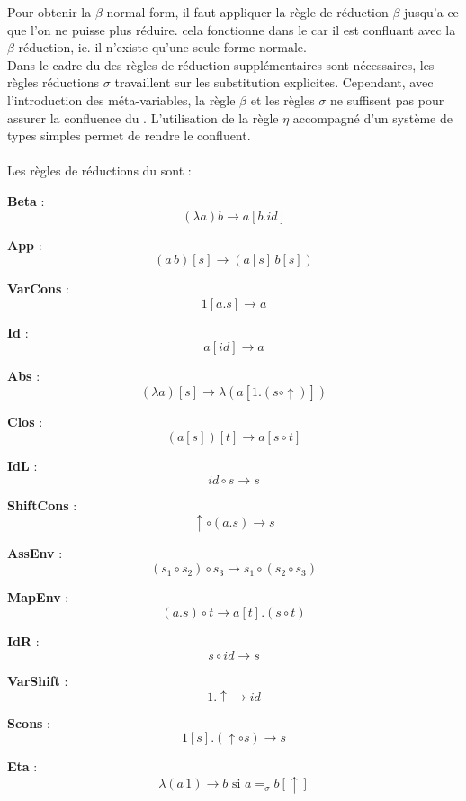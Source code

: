 Pour obtenir la $\beta$-normal form, il faut appliquer la règle de réduction $\beta$ jusqu'a ce que l'on ne puisse plus réduire. cela fonctionne dans le \lc{} car il est confluant avec la $\beta$-réduction, ie. il n'existe qu'une seule forme normale.
\noindent
\\
Dans le cadre du \lsc{} des règles de réduction supplémentaires sont nécessaires, les règles réductions $\sigma$ travaillent sur les substitution explicites.
Cependant, avec l'introduction des méta-variables, la règle $\beta$ et les règles $\sigma$ ne suffisent pas pour assurer la confluence du \lsc{}.
L'utilisation de la règle $\eta$ accompagné d'un système de types simples permet de rendre le \lsc{} confluent.
~\\
\\
Les règles de réductions du \lsc{} sont :
\begin{description}
    \item \textbf{Beta} : \[ (\lambda a) b \xrightarrow{} a[b.id] \]
    \item \textbf{App} : \[ (a \, b)[s] \xrightarrow{} (a[s] \, b[s]) \]
    \item \textbf{VarCons} : \[ 1[a.s] \xrightarrow{} a \]
    \item \textbf{Id} : \[ a[id] \xrightarrow{} a \]
    \item \textbf{Abs} : \[ (\lambda a)[s] \xrightarrow{} \lambda ( a [1 . (s \circ \uparrow)]) \]
    \item \textbf{Clos} : \[ (a[s])[t] \xrightarrow{} a[s \circ t] \]
    \item \textbf{IdL} : \[ id \circ s \xrightarrow{} s \]
    \item \textbf{ShiftCons} : \[ \uparrow \circ (a.s)\xrightarrow{} s \]
    \item \textbf{AssEnv} : \[ (s_1 \circ s_2) \circ s_3 \xrightarrow{} s_1 \circ (s_2 \circ s_3) \]
    \item \textbf{MapEnv} : \[ (a.s) \circ t \xrightarrow{} a[t] . (s \circ t) \]
    \item \textbf{IdR} : \[ s \circ id \xrightarrow{} s \]
    \item \textbf{VarShift} : \[1.\uparrow \xrightarrow{} id \]
    \item \textbf{Scons} : \[ 1[s].(\uparrow \circ s) \xrightarrow{} s \]
    \item \textbf{Eta} : \[ \lambda (a \, 1) \xrightarrow{} b \text{ si $a=_\sigma b[\uparrow]$} \]

\end{description}

